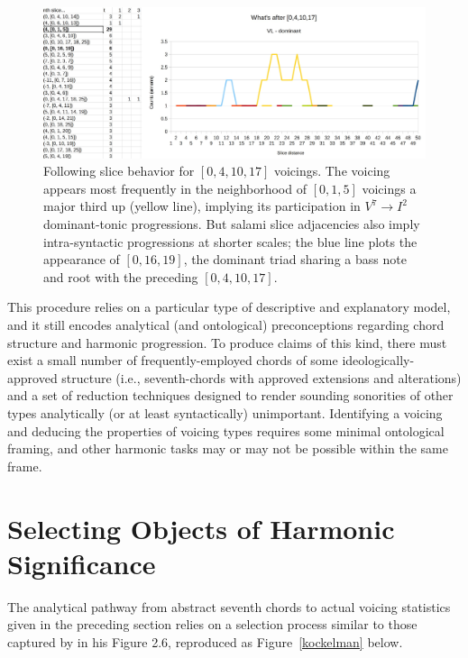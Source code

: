 \begin{figure}
	\caption{Following slice behavior for $[0,4,10,17]$ voicings.  The voicing appears most frequently in the neighborhood of $[0,1,5]$ voicings a major third up (yellow line), implying its participation in $V^7 \rightarrow I^2$ dominant-tonic progressions.  But salami slice adjacencies also imply intra-syntactic progressions at shorter scales; the blue line plots the appearance of $[0,16,19]$, the dominant triad sharing a bass note and root with the preceding $[0,4,10,17]$.}
	\label{[0,4,10,17]}
	\centering
	\includegraphics[width=6in]{041017_behavior.jpg}
\end{figure}

This procedure relies on a particular type of descriptive and explanatory model, and it still encodes analytical (and ontological) preconceptions regarding chord structure and harmonic progression.  To produce claims of this kind, there must exist a small number of frequently-employed chords of some ideologically-approved structure (i.e., seventh-chords with approved extensions and alterations) and a set of reduction techniques designed to render sounding sonorities of other types analytically (or at least syntactically) unimportant.  Identifying a voicing and deducing the properties of voicing types requires some minimal ontological framing, and other harmonic tasks may or may not be possible within the same frame.

\section{Selecting Objects of Harmonic Significance}
The analytical pathway from abstract seventh chords to actual voicing statistics given in the preceding section relies on a selection process similar to those captured by \cite{kockelman2013} in his Figure 2.6, reproduced as Figure~\ref{kockelman} below. 

